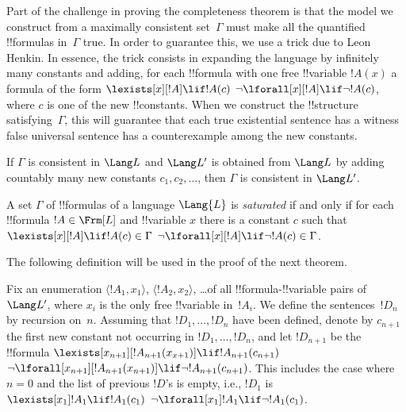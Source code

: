 \documentclass[../../include/open-logic-section]{subfiles}
\begin{document}
\begin{explain}
Part of the challenge in proving the completeness theorem is that the
model we construct from a maximally consistent set~$\Gamma$ must make
all the quantified !!{formula}s in~$\Gamma$ true.  In order to
guarantee this, we use a trick due to Leon Henkin.  In essence, the
trick consists in expanding the language by infinitely many constants
and adding, for each !!{formula} with one free !!{variable} $!A(x)$ a
formula of the form 
      {$\lexists[x][!A] \lif !A(c)$}
      {$\lnot\lforall[x][!A] \lif \lnot !A(c)$},
where $c$ is one of the new !!{constant}s.  When we construct the
!!{structure} satisfying~$\Gamma$, this will guarantee that each
{true existential sentence has a witness}
{false universal sentence has a counterexample}
among the new constants.
\end{explain}

\begin{lem}
If $\Gamma$ is consistent in $\Lang L$ and $\Lang L'$ is obtained from
$\Lang L$ by adding countably many new constants $c_1, c_2, \dots$,
then $\Gamma$ is consistent in $\Lang L'$.
\end{lem}

\begin{defn}
A set $\Gamma$ of !!{formula}s of a language $\Lang {L}$ is
\emph{saturated} if and only if for each !!{formula} $!A \in \Frm[L]$
and !!{variable} $x$ there is a constant $c$ such that
      {$\lexists[x][!A] \lif !A(c) \in \Gamma$}
      {$\lnot\lforall[x][!A] \lif \lnot !A(c) \in \Gamma$}.
\end{defn}

The following definition will be used in the proof of the next theorem.

\begin{defn}
Fix an enumeration $\langle !A_1, x_1 \rangle$, $\langle !A_2, x_2
\rangle$, \dots of all !!{formula}-!!{variable} pairs of $\Lang L'$,
where $x_i$ is the only free !!{variable} in~$!A_i$.
We define the sentences~$!D_n$ by recursion on~$n$. Assuming that
$!D_1, \dots, !D_n$ have been defined, denote by $c_{n+1}$ the first
new constant not occurring in $!D_1, \dots, !D_n$, and let $!D_{n+1}$
be the !!{formula} 
{$\lexists[x_{n+1}][!A_{n+1}(x_{x+1})] \lif !A_{n+1}(c_{n+1})$}
{$\lnot\lforall[x_{n+1}][!A_{n+1}(x_{n+1})] \lif \lnot !A_{n+1}(c_{n+1})$}. 
This includes the case where $n = 0$ and the list of previous $!D$'s
is empty, i.e., $!D_1$ is
{$\lexists[x_1] !A_1 \lif !A_1(c_1)$}
{$\lnot\lforall[x_1] !A_1 \lif \lnot !A_1(c_1)$}.
\end{defn}
\end{document}
